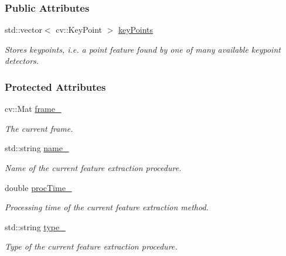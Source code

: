 \subsubsection*{Public Attributes}
\begin{DoxyCompactItemize}
\item 
std\-::vector$<$ cv\-::\-Key\-Point $>$ \hyperlink{group___feature_extractor_a72cc606c0090a64718a7e92bca7520b9}{key\-Points}
\begin{DoxyCompactList}\small\item\em Stores keypoints, i.\-e. a point feature found by one of many available keypoint detectors. \end{DoxyCompactList}\end{DoxyCompactItemize}
\subsubsection*{Protected Attributes}
\begin{DoxyCompactItemize}
\item 
cv\-::\-Mat \hyperlink{group___feature_extractor_aae4295da2c3999edcb99b46d70ee7166}{frame\-\_\-}
\begin{DoxyCompactList}\small\item\em The current frame. \end{DoxyCompactList}\item 
std\-::string \hyperlink{group___feature_extractor_abee52be830de272bd27685083bf28aae}{name\-\_\-}
\begin{DoxyCompactList}\small\item\em Name of the current feature extraction procedure. \end{DoxyCompactList}\item 
double \hyperlink{group___feature_extractor_aa3306975b929f5503dac51829f9e04a0}{proc\-Time\-\_\-}
\begin{DoxyCompactList}\small\item\em Processing time of the current feature extraction method. \end{DoxyCompactList}\item 
std\-::string \hyperlink{group___feature_extractor_ad467857c4bc3d0fe65ba29e3b8f7c796}{type\-\_\-}
\begin{DoxyCompactList}\small\item\em Type of the current feature extraction procedure. \end{DoxyCompactList}\end{DoxyCompactItemize}
